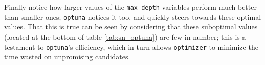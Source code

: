 Finally notice how larger values of the \texttt{max\_depth} variables perform much better than smaller ones; \texttt{optuna} notices it too, and quickly steers towards these optimal values. That this is true can be seen by considering that these suboptimal values (located at the bottom of table \ref{tab:sn_optuna}) are few in number; this is a testament to \texttt{optuna}'s efficiency, which in turn allows \texttt{optimizer} to minimize the time wasted on unpromising candidates.

